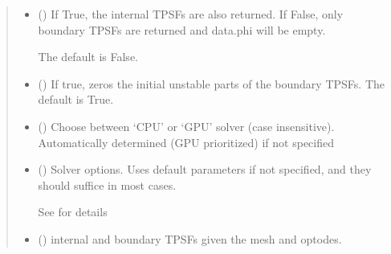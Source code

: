 \documentclass[letterpaper,10pt,english]{sphinxmanual}
\begin{document}
\begin{fulllineitems}
\begin{fulllineitems}
\begin{quote}
\begin{description}
\begin{itemize}
\item {} 
\sphinxAtStartPar
{} (\sphinxstyleliteralemphasis{\sphinxupquote{, }}) \textendash{} 
\sphinxAtStartPar
If True, the internal TPSFs are also returned. If False, only boundary TPSFs are returned and data.phi will be empty.

\sphinxAtStartPar
The default is False.


\item {} 
\sphinxAtStartPar
{} (\sphinxstyleliteralemphasis{\sphinxupquote{, }}) \textendash{} If true, zeros the initial unstable parts of the boundary TPSFs. The default is True.

\item {} 
\sphinxAtStartPar
{} (\sphinxstyleliteralemphasis{\sphinxupquote{, }}) \textendash{} Choose between ‘CPU’ or ‘GPU’ solver (case insensitive). Automatically determined (GPU prioritized) if not specified

\item {} 
\sphinxAtStartPar
{} ({\hyperref[\detokenize{_autosummary/nirfasterff.utils.SolverOptions:nirfasterff.utils.SolverOptions}]{}}\sphinxstyleliteralemphasis{\sphinxupquote{, }}) \textendash{} 
\sphinxAtStartPar
Solver options. Uses default parameters if not specified, and they should suffice in most cases.

\sphinxAtStartPar
See {\hyperref[\detokenize{_autosummary/nirfasterff.utils.SolverOptions:nirfasterff.utils.SolverOptions}]{}} for details


\end{itemize}

\sphinxAtStartPar
\begin{itemize}
\item {} 
\sphinxAtStartPar
{} () \textendash{} internal and boundary TPSFs given the mesh and optodes.


\end{itemize}
\end{description}
\end{quote}
\end{fulllineitems}
\end{fulllineitems}
\end{document}
